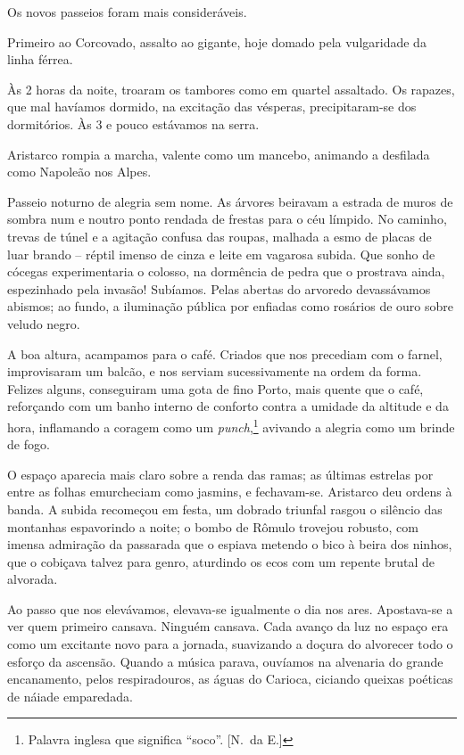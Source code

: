 Os novos passeios foram mais consideráveis. 

Primeiro ao Corcovado, assalto ao gigante, hoje
domado pela vulgaridade da linha férrea. 

Às 2 horas da noite, troaram
os tambores como em quartel assaltado. Os rapazes, que mal havíamos
dormido, na excitação das vésperas, precipitaram{}-se dos dormitórios.
Às 3 e pouco estávamos na serra. 

Aristarco rompia a marcha, valente
como um mancebo, animando a desfilada como Napoleão nos Alpes. 

Passeio noturno de alegria sem nome. As árvores beiravam a estrada de muros de
sombra num e noutro ponto rendada de frestas para o céu límpido. No
caminho, trevas de túnel e a agitação confusa das roupas, malhada a
esmo de placas de luar brando -- réptil imenso de cinza e leite em
vagarosa subida. Que sonho de cócegas experimentaria o colosso, na dormência de
pedra que o prostrava ainda, espezinhado pela invasão! Subíamos. Pelas
abertas do arvoredo devassávamos abismos; ao fundo, a iluminação
pública por enfiadas como rosários de ouro sobre veludo negro. 

A boa altura, acampamos para o café. Criados que nos precediam com o farnel,
improvisaram um balcão, e nos serviam sucessivamente na ordem da forma.
Felizes alguns, conseguiram uma gota de fino Porto, mais quente que o
café, reforçando com um banho interno de conforto contra a umidade da
altitude e da hora, inflamando a coragem como um \textit{punch},\footnote{ Palavra inglesa 
que significa ``soco''. [N.~da E.]} avivando a
alegria como um brinde de fogo. 

O espaço aparecia mais claro sobre a
renda das ramas; as últimas estrelas por entre as folhas emurcheciam
como jasmins, e fechavam{}-se. Aristarco deu ordens à banda. A subida
recomeçou em festa, um dobrado triunfal rasgou o silêncio das montanhas
espavorindo a noite; o bombo de Rômulo trovejou robusto, com imensa
admiração da passarada que o espiava metendo o bico à beira dos ninhos,
que o cobiçava talvez para genro, aturdindo os ecos com um repente
brutal de alvorada. 

Ao passo que nos elevávamos, elevava{}-se
igualmente o dia nos ares. Apostava{}-se a ver quem primeiro cansava.
Ninguém cansava. Cada avanço da luz no espaço era como um excitante
novo para a jornada, suavizando a doçura do alvorecer todo o esforço da
ascensão. Quando a música parava, ouvíamos na alvenaria do grande
encanamento, pelos respiradouros, as águas do Carioca, ciciando queixas
poéticas de náiade emparedada. 

